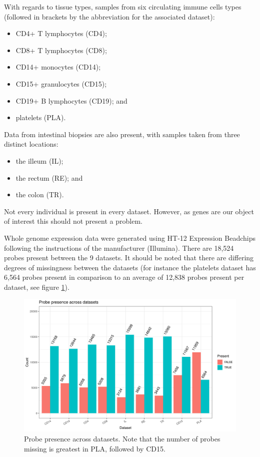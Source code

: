 \documentclass[12pt]{article} %
\begin{document}
	With regards to tissue types, samples from six circulating immune cells types (followed in brackets by the abbreviation for the associated dataset):
	\begin{itemize}
		\item CD4+ T lymphocytes (CD4);
		\item CD8+ T lymphocytes (CD8);
		\item CD14+ monocytes (CD14);
		\item CD15+ granulocytes (CD15);
		\item CD19+ B lymphocytes (CD19); and 
		\item platelets (PLA).
	\end{itemize}
	Data from intestinal biopsies are also present, with samples taken from three distinct locations:
	\begin{itemize}
		\item the illeum (IL);
		\item the rectum (RE); and
		\item the colon (TR).
	\end{itemize} 
	Not every individual is present in every dataset. However, as genes are our object of interest this should not present a problem.
	
	Whole genome expression data were generated using HT-12 Expression Beadchips following the instructions of the manufacturer (Illumina). There are 18,524 probes present between the 9 datasets. It should be noted that there are differing degrees of missingness between the datasets (for instance the platelets dataset has 6,564 probes present in comparison to an average of 12,838 probes present per dataset, see figure \ref{fig:probe_presence_across_datasets}).
	
	\begin{figure}
		\centering
		\includegraphics[scale=0.9 ]{Images/Data_inspection/probe_presence_across_datasets_no_all.png}
		\caption{Probe presence across datasets. Note that the number of probes missing is greatest in PLA, followed by CD15.}
		\label{fig:probe_presence_across_datasets}
	\end{figure}
	
\end{document}
